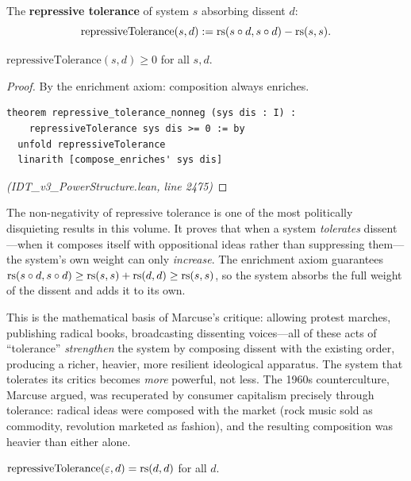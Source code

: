 \begin{definition}
\label{def:repressive-tolerance}
The \textbf{repressive tolerance} of system $s$ absorbing dissent $d$:
\[
  \mathrm{repressiveTolerance}(s, d) := \mathrm{rs}(s \circ d, s \circ d) - \mathrm{rs}(s, s).
\]
\end{definition}

\begin{theorem}
\label{thm:repressive-nonneg}
$\mathrm{repressiveTolerance}(s, d) \geq 0$ for all $s, d$.
\end{theorem}

\begin{proof}
By the enrichment axiom: composition always enriches.
\begin{lstlisting}
theorem repressive_tolerance_nonneg (sys dis : I) :
    repressiveTolerance sys dis >= 0 := by
  unfold repressiveTolerance
  linarith [compose_enriches' sys dis]
\end{lstlisting}
\textit{(IDT\_v3\_PowerStructure.lean, line 2475)}
\end{proof}

\begin{remark}
The non-negativity of repressive tolerance is one of the most politically
disquieting results in this volume. It proves that when a system
\emph{tolerates} dissent---when it composes itself with oppositional ideas
rather than suppressing them---the system's own weight can only
\emph{increase}. The enrichment axiom guarantees
$\mathrm{rs}(s \circ d, s \circ d) \geq \mathrm{rs}(s,s) + \mathrm{rs}(d,d) \geq \mathrm{rs}(s,s)$,
so the system absorbs the full weight of the dissent and adds it to its own.

This is the mathematical basis of Marcuse's critique: allowing protest marches,
publishing radical books, broadcasting dissenting voices---all of these acts
of ``tolerance'' \emph{strengthen} the system by composing dissent with the
existing order, producing a richer, heavier, more resilient ideological
apparatus. The system that tolerates its critics becomes \emph{more} powerful,
not less. The 1960s counterculture, Marcuse argued, was recuperated by
consumer capitalism precisely through tolerance: radical ideas were composed
with the market (rock music sold as commodity, revolution marketed as fashion),
and the resulting composition was heavier than either alone.
\end{remark}

\begin{theorem}
\label{thm:repressive-void}
$\mathrm{repressiveTolerance}(\varepsilon, d) = \mathrm{rs}(d, d)$ for all $d$.
\end{theorem}

